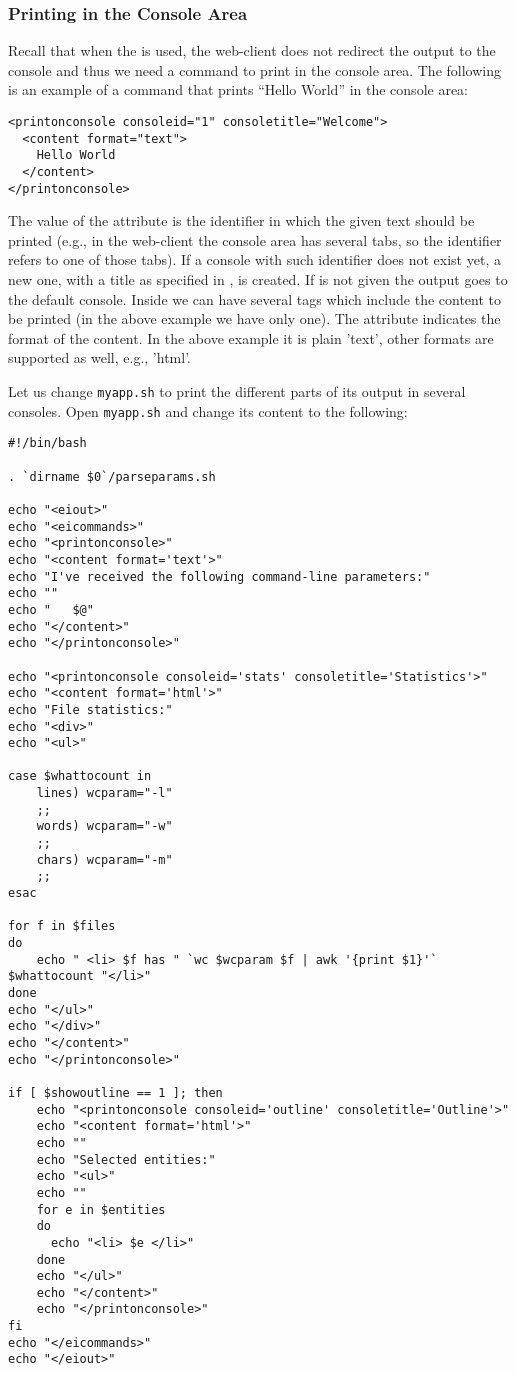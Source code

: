 \subsubsection{Printing in the Console Area}

Recall that when the \eiol is used, the web-client does not redirect
the output to the console and thus we need a command to
print in the console area.
%
The following is an example of a command that prints ``Hello World''
in the console area:

\medskip
\begin{lstlisting}
<printonconsole consoleid="1" consoletitle="Welcome">
  <content format="text">
    Hello World
  </content>
</printonconsole>
\end{lstlisting}

\medskip
\noindent
The value of the  attribute is the identifier in which
the given text should be printed (e.g., in the web-client the console
area has several tabs, so the identifier refers to one of those
tabs). If a console with such identifier does not exist yet, a new
one, with a title as specified in , is created. If
 is not given the output goes to the default console.
%
Inside  we can have several  tags
which include the content to be printed (in the above example we have
only one). The attribute  indicates the format of the
content. In the above example it is plain 'text', other formats are
supported as well, e.g., 'html'.
%

Let us change \texttt{myapp.sh} to print the different parts of its
output in several consoles. Open \texttt{myapp.sh} and change its
content to the following:


\medskip
\begin{lstlisting}[style=script]
#!/bin/bash

. `dirname $0`/parseparams.sh

echo "<eiout>"
echo "<eicommands>"
echo "<printonconsole>"
echo "<content format='text'>"
echo "I've received the following command-line parameters:"
echo ""
echo "   $@"
echo "</content>"
echo "</printonconsole>"

echo "<printonconsole consoleid='stats' consoletitle='Statistics'>"
echo "<content format='html'>"
echo "File statistics:"
echo "<div>"
echo "<ul>"

case $whattocount in
    lines) wcparam="-l"
    ;;
    words) wcparam="-w"
    ;;
    chars) wcparam="-m"
    ;;
esac

for f in $files 
do
    echo " <li> $f has " `wc $wcparam $f | awk '{print $1}'` $whattocount "</li>"
done
echo "</ul>"
echo "</div>"
echo "</content>"
echo "</printonconsole>"

if [ $showoutline == 1 ]; then
    echo "<printonconsole consoleid='outline' consoletitle='Outline'>"
    echo "<content format='html'>"
    echo ""
    echo "Selected entities:"
    echo "<ul>"
    echo ""
    for e in $entities 
    do
      echo "<li> $e </li>"
    done
    echo "</ul>"
    echo "</content>"
    echo "</printonconsole>"
fi
echo "</eicommands>"
echo "</eiout>"
\end{lstlisting}

